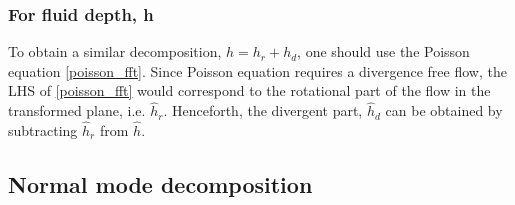 \subsubsection{For fluid depth, h}
To obtain a similar decomposition, $h = h_r + h_d$, one should use the Poisson
equation \eqref{poisson_fft}.
Since Poisson equation requires a divergence free flow, the LHS of
\eqref{poisson_fft} would correspond to the rotational part of the flow in the
transformed plane, i.e. $\hat{h}_r$. Henceforth, the divergent part, $\hat{h}_d$
can be obtained by subtracting $\hat{h}_r$ from $\hat{h}$.

\subsection{Normal mode decomposition}

